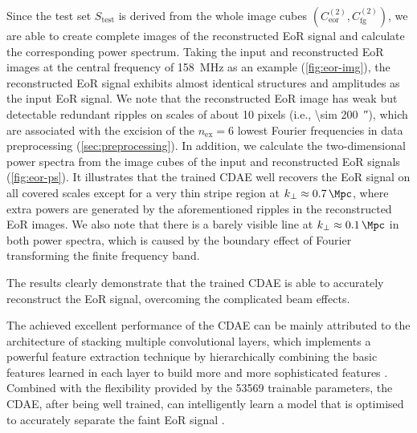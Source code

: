 \documentclass[fleqn,usenatbib]{mnras}
\newcommand{\R}[1]{\mathrm{#1}}
\newcommand{\editone}[1]{{\leavevmode\color{cyan}#1}}
\begin{document}
\editone{%
Since the test set $S_{\R{test}}$ is derived from the whole image cubes
$\left( C_{\R{eor}}^{(2)}, C_{\R{fg}}^{(2)} \right)$, we are able to create
complete images of the reconstructed EoR signal and calculate the
corresponding power spectrum.
Taking the input and reconstructed EoR images at the central frequency of
\SI{158}{\MHz} as an example (\autoref{fig:eor-img}), the reconstructed EoR
signal exhibits almost identical structures and amplitudes as the input EoR
signal.
We note that the reconstructed EoR image has weak but detectable redundant
ripples on scales of about 10 pixels (i.e., \SI{\sim 200}{\arcsecond}),
which are associated with the excision of the $n_{\R{ex}} = 6$ lowest
Fourier frequencies in data preprocessing (\autoref{sec:preprocessing}).
In addition, we calculate the two-dimensional power spectra from the image
cubes of the input and reconstructed EoR signals (\autoref{fig:eor-ps}).
It illustrates that the trained CDAE well recovers the EoR signal on all
covered scales except for a very thin stripe region at
$k_{\bot} \approx \SI{0.7}{\per\Mpc}$, where extra powers are generated
by the aforementioned ripples in the reconstructed EoR images.
We also note that there is a barely visible line at
$k_{\bot} \approx \SI{0.1}{\per\Mpc}$ in both power spectra, which is
caused by the boundary effect of Fourier transforming the finite frequency
band.

The results clearly demonstrate that the trained CDAE is able to accurately
reconstruct the EoR signal, overcoming the complicated beam effects.} %
The achieved excellent performance of the CDAE can be mainly attributed
to the architecture of stacking multiple convolutional layers, which
implements a powerful feature extraction technique by hierarchically
combining the basic features learned in each layer to build more and
more sophisticated features \citep{lecun2015}.
Combined with the flexibility provided by the \num{53569} trainable
parameters, the CDAE, after being well trained, can intelligently learn a
model that is optimised to accurately separate the faint EoR signal
\citep[e.g.,][]{domingos2012}.
\end{document}
